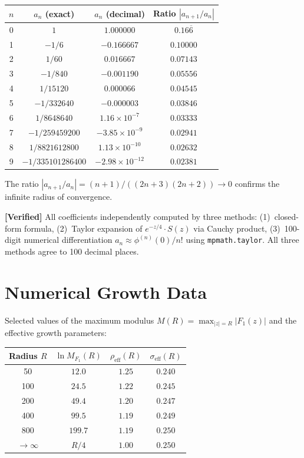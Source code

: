 \documentclass[11pt,a4paper]{article}
\theoremstyle{plain}
\theoremstyle{definition}
\newcommand{\verified}[1]{%
  \par\smallskip\noindent
  \colorbox{green!10}{\parbox{\dimexpr\linewidth-2\fboxsep}{%
    \textcolor{green!50!black}{\textbf{[Verified]}} #1}}%
  \par\smallskip}
\begin{document}
\begin{center}
\begin{tabular}{cccc}
\toprule
$n$ & $a_n$ (exact) & $a_n$ (decimal) & Ratio $|a_{n+1}/a_n|$ \\
\midrule
0 & $1$ & $1.000000$ & $0.16\overline{6}$ \\
1 & $-1/6$ & $-0.166667$ & $0.10000$ \\
2 & $1/60$ & $0.016667$ & $0.07143$ \\
3 & $-1/840$ & $-0.001190$ & $0.05556$ \\
4 & $1/15120$ & $0.000066$ & $0.04545$ \\
5 & $-1/332640$ & $-0.000003$ & $0.03846$ \\
6 & $1/8648640$ & $1.16 \times 10^{-7}$ & $0.03333$ \\
7 & $-1/259459200$ & $-3.85 \times 10^{-9}$ & $0.02941$ \\
8 & $1/8821612800$ & $1.13 \times 10^{-10}$ & $0.02632$ \\
9 & $-1/335101286400$ & $-2.98 \times 10^{-12}$ & $0.02381$ \\
\bottomrule
\end{tabular}
\end{center}

The ratio $|a_{n+1}/a_n| = (n+1)/((2n+3)(2n+2)) \to 0$
confirms the infinite radius of convergence.

\verified{All coefficients independently computed by three methods:
(1)~closed-form formula, (2)~Taylor expansion of $e^{-z/4} \cdot S(z)$
via Cauchy product, (3)~100-digit numerical differentiation
$a_n \approx \phi^{(n)}(0)/n!$ using \texttt{mpmath.taylor}.
All three methods agree to 100 decimal places.}

\section{Numerical Growth Data}\label{app:growth}

Selected values of the maximum modulus $M(R) = \max_{|z|=R} |F_1(z)|$
and the effective growth parameters:

\begin{center}
\begin{tabular}{cccc}
\toprule
Radius $R$ & $\ln M_{F_1}(R)$ & $\rho_{\mathrm{eff}}(R)$ &
$\sigma_{\mathrm{eff}}(R)$ \\
\midrule
50  & $12.0$ & $1.25$ & $0.240$ \\
100 & $24.5$ & $1.22$ & $0.245$ \\
200 & $49.4$ & $1.20$ & $0.247$ \\
400 & $99.5$ & $1.19$ & $0.249$ \\
800 & $199.7$ & $1.19$ & $0.250$ \\
$\to\infty$ & $R/4$ & $1.00$ & $0.250$ \\
\bottomrule
\end{tabular}
\end{center}
\end{document}

